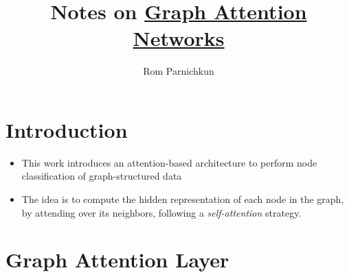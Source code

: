 \documentclass[twocolumn]{article}
\theoremstyle{plain}
\begin{document}
\title{Notes on \href{https://arxiv.org/pdf/1710.10903.pdf}{Graph Attention Networks}}
\author{Rom Parnichkun}

\maketitle

\section{Introduction}

\begin{itemize}
    \item This work introduces an attention-based architecture to perform node classification of graph-structured data
    \item The idea is to compute the hidden representation of each node in the graph, by attending over its neighbors, following a \textit{self-attention} strategy.
\end{itemize}

\section{Graph Attention Layer}
\end{document}
